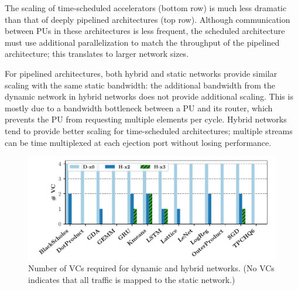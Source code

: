 The scaling of time-scheduled accelerators (bottom row) is much less dramatic than that of deeply pipelined architectures (top row). 
Although communication between PUs in these architectures is less frequent, the scheduled architecture must use additional parallelization to match the throughput of the pipelined architecture; this translates to larger network sizes. 

For pipelined architectures, both hybrid and static networks provide similar scaling with the same static bandwidth:
the additional bandwidth from the dynamic network in hybrid networks does not provide additional scaling. 
This is mostly due to a bandwidth bottleneck between a PU and its router, which prevents the PU from requesting multiple elements per cycle.
Hybrid networks tend to provide better scaling for time-scheduled architectures; multiple streams can be time multiplexed at each ejection port without losing performance.

\begin{figure}
\centering
\includegraphics[width=1\columnwidth]{figs/vc.pdf}
  \caption{Number of VCs required for dynamic and hybrid networks. (No VCs indicates that all traffic is mapped to the static network.)}\label{fig:vc}
\end{figure}

